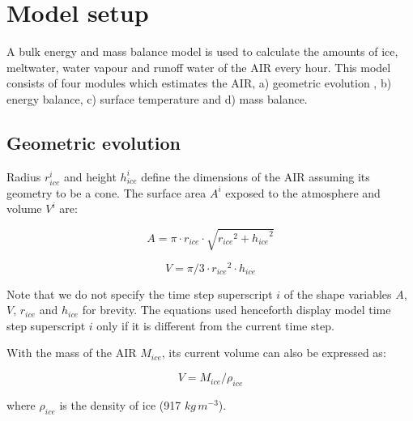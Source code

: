 \documentclass[utf8]{frontiersSCNS} %
\begin{document}
\section{Model setup}

A bulk energy and mass balance model is used to calculate the amounts of ice, meltwater, water vapour and runoff water
of the AIR every hour. This model consists of four modules which estimates the AIR, a) geometric evolution , b) energy
balance, c) surface temperature and d) mass balance. 


\subsection{Geometric evolution}

Radius $r_{ice}^i$ and height $h_{ice}^i$ define the dimensions of the AIR assuming its geometry to be a cone. The surface area $A^i$ exposed to the atmosphere and volume $V^i$ are:

\begin{equation} A = \pi \cdot r_{ice} \cdot \sqrt{{r_{ice}}^2 + {h_{ice}}^ 2} \label{eqn:A} \end{equation}

\begin{equation} V = \pi/3 \cdot {r_{ice}}^2 \cdot h_{ice} \label{eqn:V} \end{equation}

Note that we do not specify the time step superscript $i$ of the shape variables $A$, $V$, $r_{ice}$ and $h_{ice}$ for
brevity.  The equations used henceforth display model time step superscript $i$ only if it is different from the
current time step.

With the mass of the AIR $M_{ice}$, its current volume can also be expressed as: 

\begin{equation} V = M_{ice} /\rho_{ice} \label{eqn:V1} \end{equation} 

where $\rho_{ice}$ is the density of ice (917 $kg\, m^{-3}$). 
\end{document}
